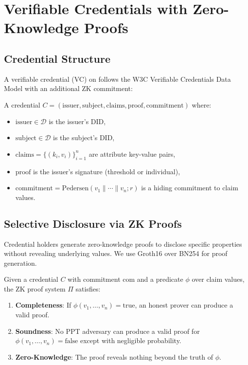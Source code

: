 \section{Verifiable Credentials with Zero-Knowledge Proofs}


\subsection{Credential Structure}

A verifiable credential (VC) on \IChain{} follows the W3C Verifiable Credentials Data Model \cite{w3c-vc-data-model} with an additional ZK commitment:

\begin{definition}
A credential $C = (\text{issuer}, \text{subject}, \text{claims}, \text{proof}, \text{commitment})$ where:
\begin{itemize}
\item $\text{issuer} \in \mathcal{D}$ is the issuer's DID,
\item $\text{subject} \in \mathcal{D}$ is the subject's DID,
\item $\text{claims} = \{(k_i, v_i)\}_{i=1}^{n}$ are attribute key-value pairs,
\item $\text{proof}$ is the issuer's signature (threshold or individual),
\item $\text{commitment} = \text{Pedersen}(v_1 \| \cdots \| v_n; r)$ is a hiding commitment to claim values.
\end{itemize}
\end{definition}

\subsection{Selective Disclosure via ZK Proofs}

Credential holders generate zero-knowledge proofs to disclose specific properties without revealing underlying values. We use Groth16 \cite{groth2016size} over BN254 for proof generation.

\begin{proposition}
Given a credential $C$ with commitment $\text{com}$ and a predicate $\phi$ over claim values, the ZK proof system $\Pi$ satisfies:
\begin{enumerate}
\item \textbf{Completeness}: If $\phi(v_1, \ldots, v_n) = \text{true}$, an honest prover can produce a valid proof.
\item \textbf{Soundness}: No PPT adversary can produce a valid proof for $\phi(v_1, \ldots, v_n) = \text{false}$ except with negligible probability.
\item \textbf{Zero-Knowledge}: The proof reveals nothing beyond the truth of $\phi$.
\end{enumerate}
\end{proposition}

